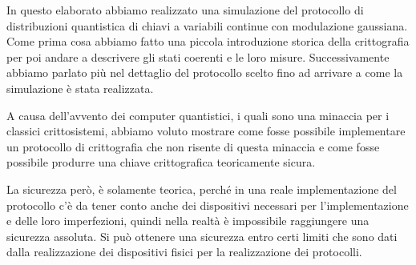 In questo elaborato abbiamo realizzato una simulazione del protocollo di distribuzioni quantistica di chiavi a variabili continue con modulazione gaussiana. Come prima cosa abbiamo fatto una piccola introduzione storica della crittografia per poi andare a descrivere gli stati coerenti e le loro misure. Successivamente abbiamo parlato pi\`u nel dettaglio del protocollo scelto fino ad arrivare a come la simulazione \`e stata realizzata.

A causa dell'avvento dei computer quantistici, i quali sono una minaccia per i classici crittosistemi, abbiamo voluto mostrare come fosse possibile implementare un protocollo di crittografia che non risente di questa minaccia e come fosse possibile produrre una chiave crittografica teoricamente sicura.

La sicurezza per\`o, \`e solamente teorica, perch\'e in una reale implementazione del protocollo c'\`e da tener conto anche dei dispositivi necessari per l'implementazione e delle loro imperfezioni, quindi nella realt\`a \`e impossibile raggiungere una sicurezza assoluta. Si pu\`o ottenere una sicurezza entro certi limiti che sono dati dalla realizzazione dei dispositivi fisici per la realizzazione dei protocolli.


